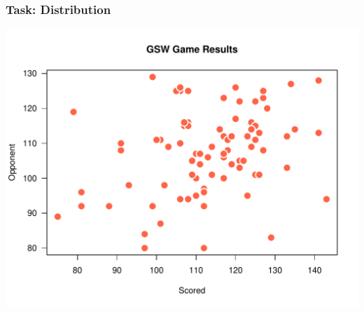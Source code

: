 \documentclass[12pt]{beamer}\usepackage[]{graphicx}\usepackage[]{color}
\makeatletter
\def\maxwidth{ %
  \ifdim\Gin@nat@width>\linewidth
    \linewidth
  \else
    \Gin@nat@width
  \fi
}
\newenvironment{knitrout}{}{} %
\makeatother
\begin{document}
\begin{frame}[fragile]
\frametitle{Task: Distribution}

\begin{knitrout}\footnotesize
{}\color{fgcolor}

{\centering \includegraphics[width=\maxwidth]{figure/task_correlation-1} 

}



\end{knitrout}

\end{frame}

\end{document}
